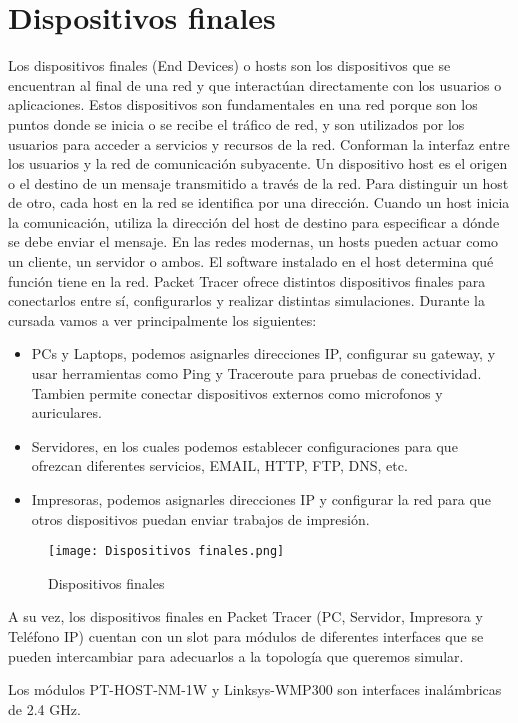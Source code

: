 \documentclass{article}
\begin{document}
\section{Dispositivos finales}
Los dispositivos finales (End Devices) o hosts son los dispositivos que se encuentran al final de una red y que interactúan directamente con los usuarios o aplicaciones. Estos dispositivos son fundamentales en una red porque son los puntos donde se inicia o se recibe el tráfico de red, y son utilizados por los usuarios para acceder a servicios y recursos de la red. Conforman la interfaz entre los usuarios y la red de comunicación subyacente. Un dispositivo host es el origen o el destino de un mensaje transmitido a través de la red. Para distinguir un host de otro, cada host en la red se identifica por una dirección. Cuando un host inicia la comunicación, utiliza la dirección del host de destino para especificar a dónde se debe enviar el mensaje. En las redes modernas, un hosts pueden actuar como un cliente, un servidor o ambos. El software instalado en el host determina qué función tiene en la red. Packet Tracer ofrece distintos dispositivos finales para conectarlos entre sí, configurarlos y realizar distintas simulaciones. Durante la cursada vamos a ver principalmente los siguientes:
\begin{itemize}
    \item PCs y Laptops, podemos asignarles direcciones IP, configurar su gateway, y usar herramientas como Ping y Traceroute para pruebas de conectividad. Tambien permite conectar dispositivos externos como microfonos y auriculares.
    \item Servidores, en los cuales podemos establecer configuraciones para que ofrezcan diferentes servicios, EMAIL, HTTP, FTP, DNS, etc.
    \item Impresoras, podemos asignarles direcciones IP y configurar la red para que otros dispositivos puedan enviar trabajos de impresión.
\end{itemize}
\begin{figure}[h]
  \centering
  \texttt{[image: Dispositivos finales.png]}
  \caption{Dispositivos finales}
\end{figure}
A su vez, los dispositivos finales en Packet Tracer (PC, Servidor, Impresora y Teléfono IP) cuentan con un slot para módulos de diferentes interfaces que se pueden intercambiar para adecuarlos a la topología que queremos simular.

Los módulos PT-HOST-NM-1W y Linksys-WMP300 son interfaces inalámbricas de 2.4 GHz.
\end{document}
